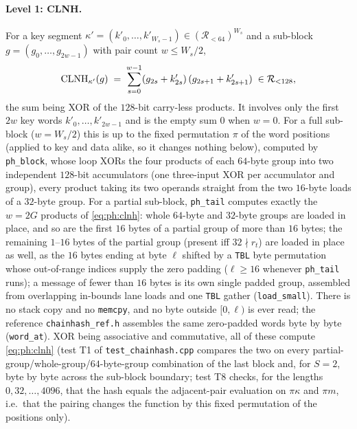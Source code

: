 \paragraph{Level 1: CLNH.}
For a key segment $\kappa'=(k'_0,\dots,k'_{W_s-1})\in(\mathcal R_{<64})^{W_s}$ and
a sub-block $g=(g_0,\dots,g_{2w-1})$ with pair count $w\le W_s/2$,
\begin{equation}\label{eq:ph:clnh}
  \mathrm{CLNH}_{\kappa'}(g)\;=\;\sum_{s=0}^{w-1}(g_{2s}+k'_{2s})\,(g_{2s+1}+k'_{2s+1})\;\in\mathcal R_{<128},
\end{equation}
the sum being XOR of the $128$-bit carry-less products.  It involves only
the first $2w$ key words $k'_0,\dots,k'_{2w-1}$ and is the empty sum $0$ when
$w=0$.  For a full sub-block ($w=W_s/2$) this is \cite[eq.~(7)]{lemire2015clhash}
up to the fixed permutation $\pi$ of the word positions (applied to key and
data alike, so it changes nothing below), computed by \texttt{ph\_block},
whose loop XORs the four products of each $64$-byte group into two
independent $128$-bit accumulators (one three-input XOR per accumulator and
group), every product taking its two operands straight from the two
$16$-byte loads of a $32$-byte group.  For a partial sub-block,
\texttt{ph\_tail} computes exactly the $w=2G$ products of \eqref{eq:ph:clnh}:
whole $64$-byte and $32$-byte groups are loaded in place, and so are the
first $16$ bytes of a partial group of more than $16$ bytes; the remaining
$1$--$16$ bytes of the partial group (present iff $32\nmid r_t$) are loaded
in place as well, as the $16$ bytes ending at byte $\ell$ shifted by a
\texttt{TBL} byte permutation whose out-of-range indices supply the zero
padding ($\ell\ge16$ whenever \texttt{ph\_tail} runs); a message of fewer
than $16$ bytes is its own single padded group, assembled from overlapping
in-bounds lane loads and one \texttt{TBL} gather (\texttt{load\_small}).
There is no stack copy and no \texttt{memcpy}, and no byte outside
$[0,\ell)$ is ever read; the reference \texttt{chainhash\_ref.h} assembles
the same zero-padded words byte by byte (\texttt{word\_at}).  XOR being
associative and commutative, all of these compute \eqref{eq:ph:clnh} (test
T1 of \texttt{test\_chainhash.cpp} compares the two on every
partial-group/whole-group/$64$-byte-group combination of the last block and,
for $S=2$, byte by byte across the sub-block boundary; test T8 checks, for
the lengths $0,32,\dots,4096$, that the hash equals the adjacent-pair
evaluation on $\pi\kappa$ and $\pi m$, i.e.\ that the pairing changes the
function by this fixed permutation of the positions only).

